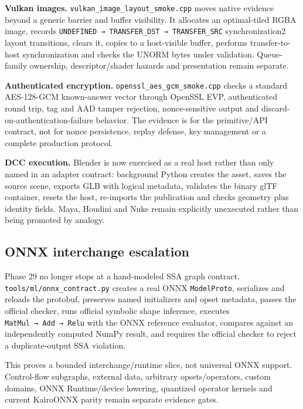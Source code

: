 \textbf{Vulkan images.} \texttt{vulkan\_image\_layout\_smoke.cpp} moves native evidence beyond a generic barrier and buffer visibility. It allocates an optimal-tiled RGBA image, records \texttt{UNDEFINED\ →\ TRANSFER\_DST\ →\ TRANSFER\_SRC} synchronization2 layout transitions, clears it, copies to a host-visible buffer, performs transfer-to-host synchronization and checks the UNORM bytes under validation. Queue-family ownership, descriptor/shader hazards and presentation remain separate.

\textbf{Authenticated encryption.} \texttt{openssl\_aes\_gcm\_smoke.cpp} checks a standard AES-128-GCM known-answer vector through OpenSSL EVP, authenticated round trip, tag and AAD tamper rejection, nonce-sensitive output and discard-on-authentication-failure behavior. The evidence is for the primitive/API contract, not for nonce persistence, replay defense, key management or a complete production protocol.

\textbf{DCC execution.} Blender is now exercised as a real host rather than only named in an adapter contract: background Python creates the asset, saves the source scene, exports GLB with logical metadata, validates the binary glTF container, resets the host, re-imports the publication and checks geometry plus identity fields. Maya, Houdini and Nuke remain explicitly unexecuted rather than being promoted by analogy.

\subsection{ONNX interchange escalation}\label{appendix-2358b21a702d-onnx-interchange-escalation}

\hypertarget{appendix-2358b21a702d-onnx-interchange-escalation}{}

Phase 29 no longer stops at a hand-modeled SSA graph contract. \texttt{tools/ml/onnx\_contract.py} creates a real ONNX \texttt{ModelProto}, serializes and reloads the protobuf, preserves named initializers and opset metadata, passes the official checker, runs official symbolic shape inference, executes \texttt{MatMul\ →\ Add\ →\ Relu} with the ONNX reference evaluator, compares against an independently computed NumPy result, and requires the official checker to reject a duplicate-output SSA violation.

This proves a bounded interchange/runtime slice, not universal ONNX support. Control-flow subgraphs, external data, arbitrary opsets/operators, custom domains, ONNX Runtime/device lowering, quantized operator kernels and current KairoONNX parity remain separate evidence gates.
